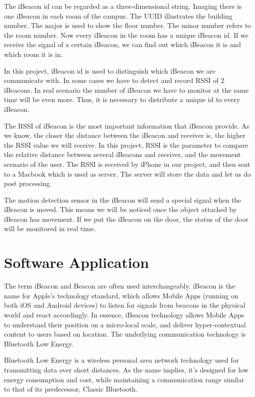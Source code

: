 \documentclass[12pt]{report}
\begin{document}
The iBeacon id can be regarded as a three-dimensional string. Imaging there is one iBeacon in each room of the campus. The UUID illustrates the building number. The major is used to show the floor number. The minor number refers to the room number. Now every iBeacon in the room has a unique iBeacon id. If we receive the signal of a certain iBeacon, we can find out which iBeacon it is and which room it is in.

In this project, iBeacon id is used to distinguish which iBeacon we are communicate with. In some cases we have to detect and record RSSI of 2 iBeacons. In real scenario the number of iBeacon we have to monitor at the same time will be even more. Thus, it is necessary to distribute a unique id to every iBeacon.

The RSSI of iBeacon is the most important information that iBeacon provide. As we know, the closer the distance between the iBeacon and receiver is, the higher the RSSI value we will receive. In this project, RSSI is the parameter to compare the relative distance between several iBeacons and receiver, and the movement scenario of the user. The RSSI is received by iPhone in our project, and then sent to a Macbook which is used as server. The server will store the data and let us do post processing.

The motion detection sensor in the iBeacon will send a special signal when the iBeacon is moved. This means we will be noticed once the object attached by iBeacon has movement. If we put the iBeacon on the door, the status of the door will be monitored in real time.

\section{Software Application}
The term iBeacon and Beacon are often used interchangeably. iBeacon is the name for Apple’s technology standard, which allows Mobile Apps (running on both iOS and Android devices) to listen for signals from beacons in the physical world and react accordingly. In essence, iBeacon technology allows Mobile Apps to understand their position on a micro-local scale, and deliver hyper-contextual content to users based on location. The underlying communication technology is Bluetooth Low Energy.

Bluetooth Low Energy is a wireless personal area network technology used for transmitting data over short distances. As the name implies, it’s designed for low energy consumption and cost, while maintaining a communication range similar to that of its predecessor, Classic Bluetooth.
\end{document}
